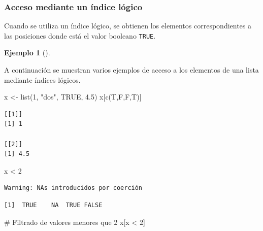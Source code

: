 \documentclass[
  a4paper,
]{scrreport}
\newenvironment{Shaded}{\begin{snugshade}}{\end{snugshade}}
\newcommand{\CommentTok}[1]{\textcolor[rgb]{0.37,0.37,0.37}{#1}}
\newcommand{\ConstantTok}[1]{\textcolor[rgb]{0.56,0.35,0.01}{#1}}
\newcommand{\DecValTok}[1]{\textcolor[rgb]{0.68,0.00,0.00}{#1}}
\newcommand{\FloatTok}[1]{\textcolor[rgb]{0.68,0.00,0.00}{#1}}
\newcommand{\FunctionTok}[1]{\textcolor[rgb]{0.28,0.35,0.67}{#1}}
\newcommand{\NormalTok}[1]{\textcolor[rgb]{0.00,0.23,0.31}{#1}}
\newcommand{\OtherTok}[1]{\textcolor[rgb]{0.00,0.23,0.31}{#1}}
\newcommand{\SpecialCharTok}[1]{\textcolor[rgb]{0.37,0.37,0.37}{#1}}
\newcommand{\StringTok}[1]{\textcolor[rgb]{0.13,0.47,0.30}{#1}}
\theoremstyle{definition}
\newtheorem{example}{Ejemplo}[chapter]
\theoremstyle{definition}
\theoremstyle{remark}
\begin{document}
\hypertarget{acceso-mediante-un-uxedndice-luxf3gico-1}{%
\subsubsection{Acceso mediante un índice
lógico}\label{acceso-mediante-un-uxedndice-luxf3gico-1}}

Cuando se utiliza un índice lógico, se obtienen los elementos
correspondientes a las posiciones donde está el valor booleano
\texttt{TRUE}.

\leavevmode{}%
\begin{example}[]\label{exm-acceso-listas-logico}

A continuación se muestran varios ejemplos de acceso a los elementos de
una lista mediante índices lógicos.

\begin{Shaded}
\begin{Highlighting}[]
\NormalTok{x }\OtherTok{\textless{}{-}} \FunctionTok{list}\NormalTok{(}\DecValTok{1}\NormalTok{, }\StringTok{"dos"}\NormalTok{, }\ConstantTok{TRUE}\NormalTok{, }\FloatTok{4.5}\NormalTok{)}
\NormalTok{x[}\FunctionTok{c}\NormalTok{(T,F,F,T)]}
\end{Highlighting}
\end{Shaded}

\begin{verbatim}
[[1]]
[1] 1

[[2]]
[1] 4.5
\end{verbatim}

\begin{Shaded}
\begin{Highlighting}[]
\NormalTok{x }\SpecialCharTok{\textless{}} \DecValTok{2}
\end{Highlighting}
\end{Shaded}

\begin{verbatim}
Warning: NAs introducidos por coerción
\end{verbatim}

\begin{verbatim}
[1]  TRUE    NA  TRUE FALSE
\end{verbatim}

\begin{Shaded}
\begin{Highlighting}[]
\CommentTok{\# Filtrado de valores menores que 2}
\NormalTok{x[x }\SpecialCharTok{\textless{}} \DecValTok{2}\NormalTok{]}
\end{Highlighting}
\end{Shaded}


\end{example}
\end{document}
